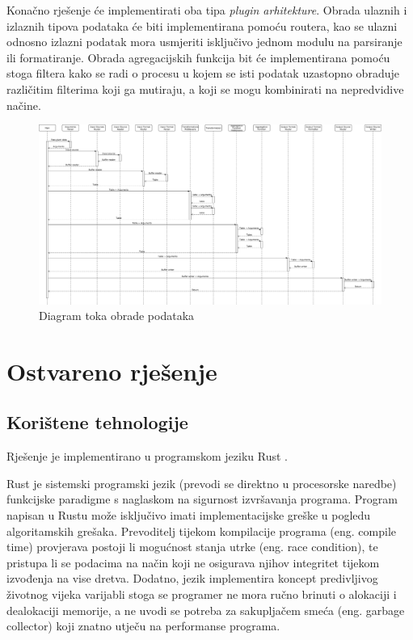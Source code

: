 \documentclass[times, utf8, zavrsni]{fer}
\begin{document}
Konačno rješenje će implementirati
oba tipa \textit{plugin arhitekture}. Obrada ulaznih i izlaznih tipova podataka
će biti
implementirana pomoću routera, kao se ulazni odnosno izlazni podatak mora
usmjeriti isključivo jednom modulu na parsiranje ili formatiranje. Obrada
agregacijskih funkcija bit će implementirana pomoću stoga filtera kako se
radi o procesu u kojem se isti podatak uzastopno obraduje različitim filterima
koji ga mutiraju, a koji se mogu kombinirati na nepredvidive načine.

\begin{figure}[h]
  \centering
  \includegraphics[width=\textheight, angle=90]{data_processing_flow_chart}
  \caption{Diagram toka obrade podataka}
  \label{data_processing_flow_chart}
\end{figure}

\chapter{Ostvareno rješenje}

\section{Korištene tehnologije}

Rješenje je implementirano u programskom jeziku Rust \cite{rust_lang_page}.

Rust je sistemski programski jezik (prevodi se direktno u procesorske
naredbe) funkcijske paradigme s naglaskom na sigurnost izvršavanja programa.
Program napisan u Rustu može isključivo imati implementacijske greške u pogledu
algoritamskih grešaka. Prevoditelj tijekom kompilacije programa (eng. compile
time) provjerava postoji li mogućnost stanja utrke (eng. race condition), te
pristupa li se podacima na način koji ne osigurava njihov integritet tijekom
izvođenja na vise dretva. Dodatno, jezik implementira koncept predivljivog
životnog vijeka varijabli stoga se programer ne mora ručno brinuti o alokaciji
i dealokaciji memorije, a ne uvodi se potreba za sakupljačem smeća (eng.
garbage collector) koji znatno utječu na performanse programa.
\end{document}
